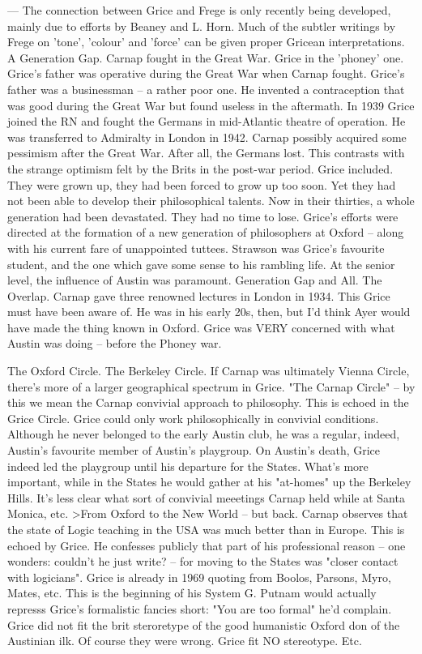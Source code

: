 \documentclass[10pt,titlepage]{book}
\begin{document}
---  The connection between Grice and 
Frege is only recently being developed, mainly  due to efforts by Beaney and 
L. Horn. Much of the subtler writings by Frege on  'tone', 'colour' and 
'force' can be given proper Gricean  interpretations. 
A  Generation Gap. Carnap fought in the Great War. Grice in the 'phoney' 
one.  Grice's father was operative during the Great War when Carnap fought. 
Grice's  father was a businessman -- a rather poor one. He invented a 
contraception that  was good during the Great War but found useless in the 
aftermath. In 1939 Grice  joined the RN and fought the Germans in mid-Atlantic 
theatre of operation. He  was transferred to Admiralty in London in 1942. Carnap 
possibly acquired some  pessimism after the Great War. After all, the Germans 
lost. This contrasts  with the strange optimism felt by the Brits in the 
post-war period. Grice  included. They were grown up, they had been forced to 
grow up too soon. Yet they  had not been able to develop their philosophical 
talents. Now in their thirties,  a whole generation had been devastated. 
They had no time to lose. Grice's  efforts were directed at the formation of a 
new generation of philosophers at  Oxford -- along with his current fare of 
unappointed tuttees. Strawson was  Grice's favourite student, and the one 
which gave some sense to his rambling  life. At the senior level, the 
influence of Austin was  paramount. 
Generation  Gap and All. The Overlap. Carnap gave three renowned lectures 
in London in 1934. This  Grice must have been aware of. He was in his early 
20s, then, but I’d think Ayer  would have made the thing known in Oxford. 
Grice was VERY  concerned with  what Austin was doing -- before the Phoney war.

The  Oxford Circle. The Berkeley Circle. If Carnap was ultimately Vienna 
Circle,  there’s more of a larger geographical spectrum in Grice. "The Carnap 
Circle" --  by this we mean the Carnap convivial approach to philosophy. 
This is echoed in  the Grice Circle. Grice could only work philosophically in 
convivial conditions.  Although he never belonged to the early Austin club, 
he was a regular, indeed,  Austin's favourite member of Austin's playgroup. 
On Austin's death, Grice indeed  led the playgroup until his departure for 
the States. What's more important,  while in the States he would gather at his 
"at-homes" up the Berkeley Hills.  It's less clear what sort of convivial 
meeetings Carnap held while at Santa  Monica, etc. 
>From  Oxford to the New World – but back. Carnap  observes that the state 
of Logic teaching in  the USA was much better than  in Europe. This is echoed 
by Grice. He confesses publicly that part of his  professional reason -- 
one wonders:  couldn't he just write? -- for moving  to the States was "closer 
contact 
with  logicians". Grice is already in  1969 quoting from Boolos, Parsons, 
Myro, Mates, etc.  This is the beginning  of his System G. Putnam would 
actually represss Grice's formalistic fancies  short: "You are too formal" he'd 
complain. Grice did not fit  the brit  steroretype of the good humanistic 
Oxford don of the 
Austinian ilk. Of   course they were wrong. Grice fit NO stereotype. Etc.
\end{document}
